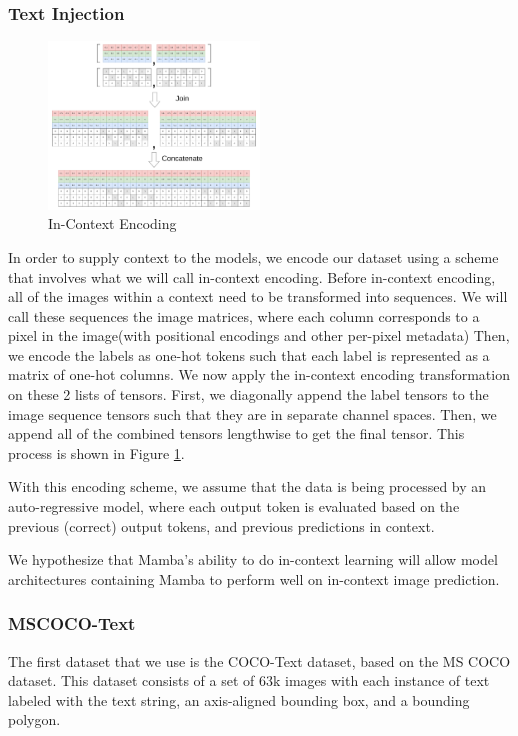\subsubsection{Text Injection}
\begin{figure}[ht]
    \begin{center}
    \includegraphics[width=0.5\textwidth]{figures/in_context_encoding.pdf}
    \end{center}
    \caption{In-Context Encoding}
    \label{incontextencoding}
\end{figure}

In order to supply context to the models, we encode our dataset using a scheme
that involves what we will call in-context encoding.
Before in-context encoding, all of the images within a context need to be
transformed into sequences.
We will call these sequences the image matrices, where each column corresponds
to a pixel in the image(with positional encodings and other per-pixel metadata)
Then, we encode the labels as one-hot tokens such that each label is represented
as a matrix of one-hot columns.
We now apply the in-context encoding transformation on these 2 lists of tensors.
First, we diagonally append the label tensors to the image sequence tensors such
that they are in separate channel spaces.
Then, we append all of the combined tensors lengthwise to get the final tensor.
This process is shown in Figure \ref{incontextencoding}.

With this encoding scheme, we assume that the data is being processed by an
auto-regressive model, where each output token is evaluated based on the
previous (correct) output tokens, and previous predictions in context.

We hypothesize that Mamba's ability to do in-context learning\cite{mamba} will
allow model architectures containing Mamba to perform well on in-context
image prediction.

\subsubsection{MSCOCO-Text}
The first dataset that we use is the COCO-Text dataset, based on the MS COCO
dataset\cite{cocotext}\cite{mscoco}.
This dataset consists of a set of 63k images with each instance of text labeled
with the text string, an axis-aligned bounding box, and a bounding polygon.

